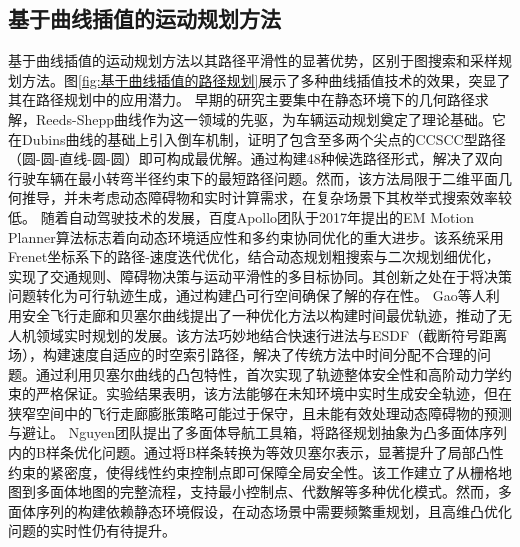 \documentclass[master,academic]{ysuthesis} %
\begin{document}
		\subsection{基于曲线插值的运动规划方法}
		基于曲线插值的运动规划方法以其路径平滑性的显著优势，区别于图搜索和采样规划方法。图\ref{fig:基于曲线插值的路径规划}展示了多种曲线插值技术的效果，突显了其在路径规划中的应用潜力。
		早期的研究主要集中在静态环境下的几何路径求解，Reeds-Shepp曲线作为这一领域的先驱，为车辆运动规划奠定了理论基础。它在Dubins曲线的基础上引入倒车机制，证明了包含至多两个尖点的CCSCC型路径（圆-圆-直线-圆-圆）即可构成最优解。通过构建48种候选路径形式，解决了双向行驶车辆在最小转弯半径约束下的最短路径问题。然而，该方法局限于二维平面几何推导，并未考虑动态障碍物和实时计算需求，在复杂场景下其枚举式搜索效率较低。
		随着自动驾驶技术的发展，百度Apollo团队于2017年提出的EM Motion Planner算法标志着向动态环境适应性和多约束协同优化的重大进步。该系统采用Frenet坐标系下的路径-速度迭代优化，结合动态规划粗搜索与二次规划细优化，实现了交通规则、障碍物决策与运动平滑性的多目标协同。其创新之处在于将决策问题转化为可行轨迹生成，通过构建凸可行空间确保了解的存在性。
		Gao等人利用安全飞行走廊和贝塞尔曲线提出了一种优化方法以构建时间最优轨迹，推动了无人机领域实时规划的发展。该方法巧妙地结合快速行进法与ESDF（截断符号距离场），构建速度自适应的时空索引路径，解决了传统方法中时间分配不合理的问题。通过利用贝塞尔曲线的凸包特性，首次实现了轨迹整体安全性和高阶动力学约束的严格保证。实验结果表明，该方法能够在未知环境中实时生成安全轨迹，但在狭窄空间中的飞行走廊膨胀策略可能过于保守，且未能有效处理动态障碍物的预测与避让。
		Nguyen团队提出了多面体导航工具箱，将路径规划抽象为凸多面体序列内的B样条优化问题。通过将B样条转换为等效贝塞尔表示，显著提升了局部凸性约束的紧密度，使得线性约束控制点即可保障全局安全性。该工作建立了从栅格地图到多面体地图的完整流程，支持最小控制点、代数解等多种优化模式。然而，多面体序列的构建依赖静态环境假设，在动态场景中需要频繁重规划，且高维凸优化问题的实时性仍有待提升。
\end{document}
